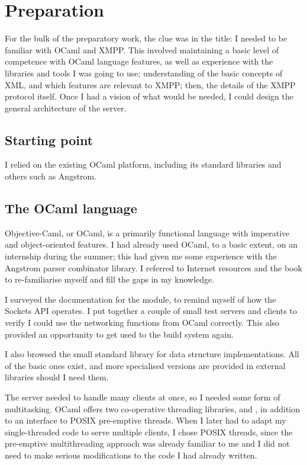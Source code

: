 \chapter{Preparation}
For the bulk of the preparatory work, the clue was in the title: I needed to be familiar with OCaml and XMPP. This involved maintaining a basic level of competence with OCaml language features, as well as experience with the libraries and tools I was going to use; understanding of the basic concepts of XML, and which features are relevant to XMPP; then, the details of the XMPP protocol itself. Once I had a vision of what would be needed, I could design the general architecture of the server.

\section{Starting point}
I relied on the existing OCaml platform, including its standard libraries and others such as Angstrom.

\section{The OCaml language}
Objective-Caml, or OCaml, is a primarily functional language with imperative and object-oriented features. I had already used OCaml, to a basic extent, on an internship during the summer; this had given me some experience with the Angstrom parser combinator library. I referred to Internet resources and the  book to re-familiarise myself and fill the gaps in my knowledge.

I surveyed the documentation for the  module, to remind myself of how the Sockets API operates. I put together a couple of small test servers and clients to verify I could use the networking functions from OCaml correctly. This also provided an opportunity to get used to the build system again.

I also browsed the small standard library for data structure implementations. All of the basic ones exist, and more specialised versions are provided in external libraries should I need them.

The server needed to handle many clients at once, so I needed some form of multitasking. OCaml offers two co-operative threading libraries,  and , in addition to an interface to POSIX pre-emptive threads. When I later had to adapt my single-threaded code to serve multiple clients, I chose POSIX threads, since the pre-emptive multithreading approach was already familiar to me and I did not need to make serious modifications to the code I had already written.

